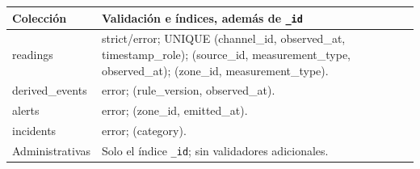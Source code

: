 \begin{longtable}{>{\raggedright\arraybackslash}p{}>{\raggedright\arraybackslash}p{}}
\toprule Colección & Validación e índices, además de \texttt{\_id} \\
\midrule\endhead
readings & strict/error; UNIQUE (channel\_id, observed\_at, timestamp\_role);
(source\_id, measurement\_type, observed\_at); (zone\_id, measurement\_type). \\
derived\_events & error; (rule\_version, observed\_at). \\
alerts & error; (zone\_id, emitted\_at). \\
incidents & error; (category). \\
Administrativas & Solo el índice \texttt{\_id}; sin validadores adicionales. \\
\bottomrule
\end{longtable}
\clearpage
